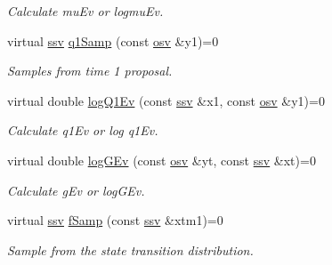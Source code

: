\begin{DoxyCompactItemize}
\begin{DoxyCompactList}\small\item\em Calculate mu\+Ev or logmu\+Ev. \end{DoxyCompactList}\item 
virtual \hyperlink{classpf_1_1BSFilter_a95fa891a3af39cb14cfe8521fb1d0f88}{ssv} \hyperlink{classpf_1_1BSFilter_aa6079ca23980bd4dc98378a88297b4bd}{q1\+Samp} (const \hyperlink{classpf_1_1BSFilter_a46aaa88331b87e69ad3d1fcdc3b1db4e}{osv} \&y1)=0
\begin{DoxyCompactList}\small\item\em Samples from time 1 proposal. \end{DoxyCompactList}\item 
virtual double \hyperlink{classpf_1_1BSFilter_a00509b44e9beb183b9f5b5b61ff6b5a3}{log\+Q1\+Ev} (const \hyperlink{classpf_1_1BSFilter_a95fa891a3af39cb14cfe8521fb1d0f88}{ssv} \&x1, const \hyperlink{classpf_1_1BSFilter_a46aaa88331b87e69ad3d1fcdc3b1db4e}{osv} \&y1)=0
\begin{DoxyCompactList}\small\item\em Calculate q1\+Ev or log q1\+Ev. \end{DoxyCompactList}\item 
virtual double \hyperlink{classpf_1_1BSFilter_a2c4dd5363a48e218e8e83024696f586b}{log\+G\+Ev} (const \hyperlink{classpf_1_1BSFilter_a46aaa88331b87e69ad3d1fcdc3b1db4e}{osv} \&yt, const \hyperlink{classpf_1_1BSFilter_a95fa891a3af39cb14cfe8521fb1d0f88}{ssv} \&xt)=0
\begin{DoxyCompactList}\small\item\em Calculate g\+Ev or log\+G\+Ev. \end{DoxyCompactList}\item 
virtual \hyperlink{classpf_1_1BSFilter_a95fa891a3af39cb14cfe8521fb1d0f88}{ssv} \hyperlink{classpf_1_1BSFilter_a56c232aa4d91895ea3c69dff65c6d20e}{f\+Samp} (const \hyperlink{classpf_1_1BSFilter_a95fa891a3af39cb14cfe8521fb1d0f88}{ssv} \&xtm1)=0
\begin{DoxyCompactList}\small\item\em Sample from the state transition distribution. \end{DoxyCompactList}\end{DoxyCompactItemize}
